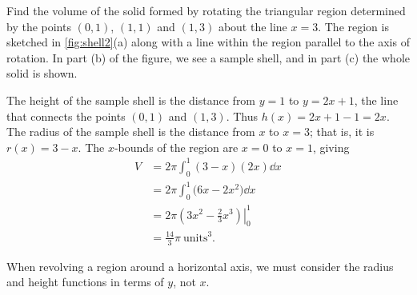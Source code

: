 \begin{example}\label{ex_shell2}
Find the volume of the solid formed by rotating the triangular region determined by the points $(0,1)$, $(1,1)$ and $(1,3)$ about the line $x=3$.
\solution
The region is sketched in \autoref{fig:shell2}(a) along with a line within the region parallel to the axis of rotation. In part (b) of the figure, we see a sample shell, and in part (c) the whole solid is shown.

The height of the sample shell is the distance from $y=1$ to $y=2x+1$, the line that connects the points $(0,1)$ and $(1,3)$. Thus $h(x) = 2x+1-1 = 2x$. The radius of the sample shell is the distance from $x$ to $x=3$; that is, it is $r(x)=3-x$. The $x$-bounds of the region are $x=0$ to $x=1$, giving
\begin{align*}
	V
	&= 2\pi\int_0^1 (3-x)(2x)\dd x \\
	&= 2\pi\int_0^1 \bigl(6x-2x^2\bigr)\dd x \\
	&= 2\pi\left.\left(3x^2-\frac23x^3\right)\right|_0^1\\
	&= \frac{14}{3}\pi%
	\ \text{units}^3.
\end{align*}
\end{example}

When revolving a region around a horizontal axis, we must consider the radius and height functions in terms of $y$, not $x$.

